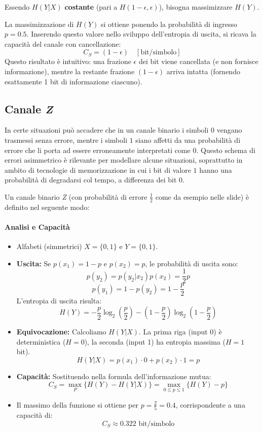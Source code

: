 Essendo $H(Y|X)$ \textbf{costante} (pari a $H(1-\epsilon,\epsilon)$), bisogna massimizzare $H(Y)$.

La massimizzazione di $H(Y)$ si ottiene ponendo la probabilità di ingresso $p = 0.5$. Inserendo questo valore nello sviluppo dell'entropia di uscita, si ricava la capacità del canale con cancellazione:
\[ C_S = (1-\epsilon) \quad [\text{bit/simbolo}] \]
Questo risultato è intuitivo: una frazione $\epsilon$ dei bit viene cancellata (e non fornisce informazione), mentre la restante frazione $(1-\epsilon)$ arriva intatta (fornendo esattamente 1 bit di informazione ciascuno).

\subsection{Canale \textit{Z}}
In certe situazioni può accadere che in un canale binario i simboli $0$ vengano trasmessi senza errore, mentre i simboli $1$ siano affetti da una probabilità di errore che li porta ad essere erroneamente interpretati come $0$. Questo schema di errori asimmetrico è rilevante per modellare alcune situazioni, soprattutto in ambito di tecnologie di memorizzazione in cui i bit di valore $1$ hanno una probabilità di degradarsi col tempo, a differenza dei bit $0$.

Un canale binario \textit{Z} (con probabilità di errore $\frac{1}{2}$ come da esempio nelle slide) è definito nel seguente modo:

%
\paragraph{Analisi e Capacità}
\begin{itemize}
    \item Alfabeti (simmetrici) $X=\{0,1\}$ e $Y=\{0,1\}$.
    \item \textbf{Uscita:} Se $p(x_1)= 1 - p$ e $p(x_2)= p$, le probabilità di uscita sono:
    \[ p(y_2) = p(y_2|x_2)p(x_2) = \frac{1}{2}p \]
    \[ p(y_1) = 1 - p(y_2) = 1 - \frac{p}{2} \]
    L'entropia di uscita risulta:
    \[ H(Y) = -\frac{p}{2}\log_2\left(\frac{p}{2}\right) - \left(1 -\frac{p}{2}\right)\log_2\left(1 -\frac{p}{2}\right) \]
    
    \item \textbf{Equivocazione:} Calcoliamo $H(Y|X)$. La prima riga (input 0) è deterministica ($H=0$), la seconda (input 1) ha entropia massima ($H=1$ bit).
    \[ H(Y|X) = p(x_1)\cdot 0 + p(x_2)\cdot 1 = p \]
    
    \item \textbf{Capacità:} Sostituendo nella formula dell'informazione mutua:
    \[ C_S = \max_P \{ H(Y) - H(Y|X) \} = \max_{0\leq p \leq 1} \{ H(Y) - p \} \]
    
    \item Il massimo della funzione si ottiene per $p = \frac{2}{5} = 0.4$, corrispondente a una capacità di:
    \[ C_S \approx 0.322 \text{ bit/simbolo} \]
\end{itemize}









